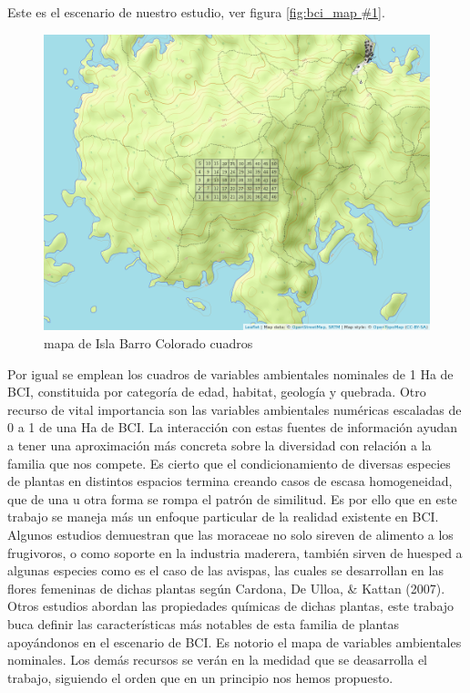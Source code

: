 \documentclass[11pt,]{article}
\begin{document}
Este es el escenario de nuestro estudio, ver figura
\ref{fig:bci_map #1}.

\begin{figure}
\centering
\includegraphics[width=1.00000\textwidth]{mapa_cuadros.png}
\caption{mapa de Isla Barro Colorado cuadros\label{fig:bci_map}}
\end{figure}

Por igual se emplean los cuadros de variables ambientales nominales de 1
Ha de BCI, constituida por categoría de edad, habitat, geología y
quebrada. Otro recurso de vital importancia son las variables
ambientales numéricas escaladas de 0 a 1 de una Ha de BCI. La
interacción con estas fuentes de información ayudan a tener una
aproximación más concreta sobre la diversidad con relación a la familia
que nos compete. Es cierto que el condicionamiento de diversas especies
de plantas en distintos espacios termina creando casos de escasa
homogeneidad, que de una u otra forma se rompa el patrón de similitud.
Es por ello que en este trabajo se maneja más un enfoque particular de
la realidad existente en BCI. Algunos estudios demuestran que las
moraceae no solo sireven de alimento a los frugivoros, o como soporte en
la industria maderera, también sirven de huesped a algunas especies como
es el caso de las avispas, las cuales se desarrollan en las flores
femeninas de dichas plantas según Cardona, De Ulloa, \& Kattan (2007).
Otros estudios abordan las propiedades químicas de dichas plantas, este
trabajo buca definir las características más notables de esta familia de
plantas apoyándonos en el escenario de BCI. Es notorio el mapa de
variables ambientales nominales. Los demás recursos se verán en la
medidad que se deasarrolla el trabajo, siguiendo el orden que en un
principio nos hemos propuesto.
\end{document}
